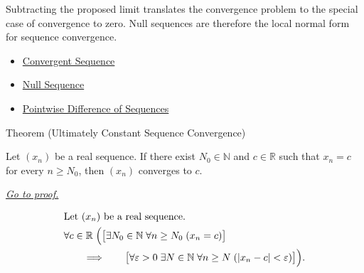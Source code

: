 \begin{remark*}[Interpretation]
Subtracting the proposed limit translates the convergence problem to the
special case of convergence to zero. Null sequences are therefore the local
normal form for sequence convergence.
\end{remark*}

\begin{dependencies}
\begin{itemize}
  \item \hyperref[def:convergent-sequence]{Convergent Sequence}
  \item \hyperref[def:null-sequence]{Null Sequence}
  \item \hyperref[def:pointwise-difference-sequence]{Pointwise Difference of Sequences}
\end{itemize}
\end{dependencies}


\begin{theorembox}{Theorem (Ultimately Constant Sequence Convergence)}
\begin{theorem}
\label{thm:ultimately-constant-sequence-convergence}
Let $(x_n)$ be a real sequence. If there exist $N_0 \in \mathbb{N}$ and
$c \in \mathbb{R}$ such that $x_n = c$ for every $n \ge N_0$, then
$(x_n)$ converges to $c$.

\smallskip
\noindent
\hyperref[prf:ultimately-constant-sequence-convergence]{\textit{Go to proof.}}
\end{theorem}
\end{theorembox}

\begin{remark*}
\[
\begin{aligned}
&\text{Let } (x_n) \text{ be a real sequence.}\\
&\forall c \in \mathbb{R}\;
\Bigl(
\bigl[
\exists N_0 \in \mathbb{N}\;
\forall n \ge N_0\;(x_n = c)
\bigr]\\
&\qquad\Longrightarrow\qquad
\bigl[
\forall \varepsilon > 0\;
\exists N \in \mathbb{N}\;
\forall n \ge N\;(|x_n - c| < \varepsilon)
\bigr]
\Bigr).
\end{aligned}
\]
\end{remark*}

